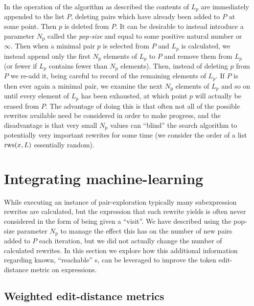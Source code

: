 \documentclass[12pt]{article}
\begin{document}
In the operation of the algorithm as described the contents of $L_p$ are immediately appended to the list $P$, deleting pairs which have already been added to $P$ at some point. Then $p$ is deleted from $P$. It can be desirable to instead introduce a parameter $N_\text{p}$ called the \textit{pop-size} and equal to some positive natural number or $\infty$. Then when a minimal pair $p$ is selected from $P$ and $L_p$ is calculated, we instead append only the first $N_\text{p}$ elements of $L_p$ to $P$ and remove them from $L_p$ (or fewer if $L_p$ contains fewer than $N_\text{p}$ elements). Then, instead of deleting $p$ from $P$ we re-add it, being careful to record of the remaining elements of $L_p$. If $P$ is then ever again a minimal pair, we examine the next $N_\text{p}$ elements of $L_p$ and so on until every element of $L_p$ has been exhausted, at which point $p$ will actually be erased from $P$. The advantage of doing this is that often not all of the possible rewrites available need be considered in order to make progress, and the disadvantage is that very small $N_\text{p}$ values can ``blind'' the search algorithm to potentially very important rewrites for some time (we consider the order of a list $\operatorname{rws}(x, L)$ essentially random).

\section{Integrating machine-learning}

While executing an instance of pair-exploration typically many subexpression rewrites are calculated, but the expression that each rewrite yields is often never considered in the form of being given a ``visit''. We have described using the pop-size parameter $N_\text{p}$ to manage the effect this has on the number of new pairs added to $P$ each iteration, but we did not actually change the number of calculated rewrites. In this section we explore how this additional information regarding known, ``reachable'' \expr{}s, can be leveraged to improve the token edit-distance metric on expressions.

\subsection{Weighted edit-distance metrics}
\end{document}
